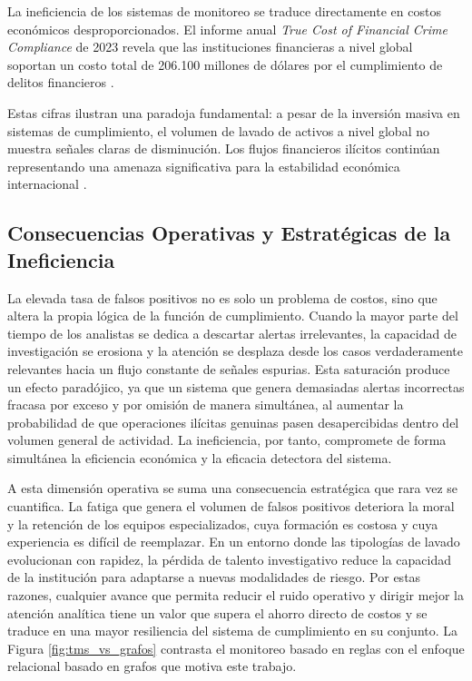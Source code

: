 La ineficiencia de los sistemas de monitoreo se traduce directamente en costos económicos desproporcionados. El informe anual \textit{True Cost of Financial Crime Compliance} de 2023 revela que las instituciones financieras a nivel global soportan un costo total de 206.100 millones de dólares por el cumplimiento de delitos financieros \cite{ForresterConsulting2023True2023}. 

Estas cifras ilustran una paradoja fundamental: a pesar de la inversión masiva en sistemas de cumplimiento, el volumen de lavado de activos a nivel global no muestra señales claras de disminución. Los flujos financieros ilícitos continúan representando una amenaza significativa para la estabilidad económica internacional \cite{UNODC2024EstimatingCrimes}.

\subsection{Consecuencias Operativas y Estratégicas de la Ineficiencia}

La elevada tasa de falsos positivos no es solo un problema de costos, sino que altera la propia lógica de la función de cumplimiento. Cuando la mayor parte del tiempo de los analistas se dedica a descartar alertas irrelevantes, la capacidad de investigación se erosiona y la atención se desplaza desde los casos verdaderamente relevantes hacia un flujo constante de señales espurias. Esta saturación produce un efecto paradójico, ya que un sistema que genera demasiadas alertas incorrectas fracasa por exceso y por omisión de manera simultánea, al aumentar la probabilidad de que operaciones ilícitas genuinas pasen desapercibidas dentro del volumen general de actividad. La ineficiencia, por tanto, compromete de forma simultánea la eficiencia económica y la eficacia detectora del sistema.

A esta dimensión operativa se suma una consecuencia estratégica que rara vez se cuantifica. La fatiga que genera el volumen de falsos positivos deteriora la moral y la retención de los equipos especializados, cuya formación es costosa y cuya experiencia es difícil de reemplazar. En un entorno donde las tipologías de lavado evolucionan con rapidez, la pérdida de talento investigativo reduce la capacidad de la institución para adaptarse a nuevas modalidades de riesgo. Por estas razones, cualquier avance que permita reducir el ruido operativo y dirigir mejor la atención analítica tiene un valor que supera el ahorro directo de costos y se traduce en una mayor resiliencia del sistema de cumplimiento en su conjunto. La Figura \ref{fig:tms_vs_grafos} contrasta el monitoreo basado en reglas con el enfoque relacional basado en grafos que motiva este trabajo.

